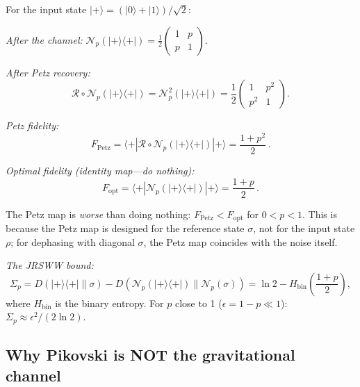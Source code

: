 \documentclass[aps,prd,preprint,superscriptaddress,longbibliography]{revtex4-2}
\newcommand{\Petz}{\mathcal{R}}
\newcommand{\chan}{\mathcal{N}}
\newcommand{\ket}[1]{|#1\rangle}
\newcommand{\bra}[1]{\langle#1|}
\begin{document}
For the input state $\ket{+} = (\ket{0}+\ket{1})/\sqrt{2}$:

\emph{After the channel:}
$\chan_p(\ket{+}\!\bra{+}) = \frac{1}{2}\left(\begin{smallmatrix}
1 & p \\ p & 1\end{smallmatrix}\right)$.

\emph{After Petz recovery:}
\begin{equation}
  \Petz\circ\chan_p(\ket{+}\!\bra{+})
  = \chan_p^2(\ket{+}\!\bra{+})
  = \frac{1}{2}\begin{pmatrix} 1 & p^2 \\ p^2 & 1 \end{pmatrix}.
  \label{eq:Petz_twice}
\end{equation}

\emph{Petz fidelity:}
\begin{equation}
  F_{\mathrm{Petz}} = \bra{+}\!\Petz\circ\chan_p(\ket{+}\!\bra{+})\!\ket{+}
  = \frac{1+p^2}{2}\,.
  \label{eq:F_Petz_dephasing}
\end{equation}

\emph{Optimal fidelity (identity map---do nothing):}
\begin{equation}
  F_{\mathrm{opt}} = \bra{+}\!\chan_p(\ket{+}\!\bra{+})\!\ket{+}
  = \frac{1+p}{2}\,.
  \label{eq:F_opt_dephasing}
\end{equation}

The Petz map is \emph{worse} than doing nothing:
$F_{\mathrm{Petz}} < F_{\mathrm{opt}}$ for $0 < p < 1$.  This is
because the Petz map is designed for the reference state $\sigma$,
not for the input state $\rho$; for dephasing with diagonal $\sigma$,
the Petz map coincides with the noise itself.

\emph{The JRSWW bound:}
\begin{equation}
  \Sigma_p = D(\ket{+}\!\bra{+}\|\sigma)
  - D(\chan_p(\ket{+}\!\bra{+})\|\chan_p(\sigma))
  = \ln 2 - H_{\mathrm{bin}}\!\left(\frac{1+p}{2}\right),
  \label{eq:Sigma_dephasing}
\end{equation}
where $H_{\mathrm{bin}}$ is the binary entropy.  For $p$ close to 1
($\epsilon = 1-p \ll 1$):
$\Sigma_p \approx \epsilon^2/(2\ln 2)$.

\subsection{Why Pikovski is NOT the gravitational channel}
\end{document}

